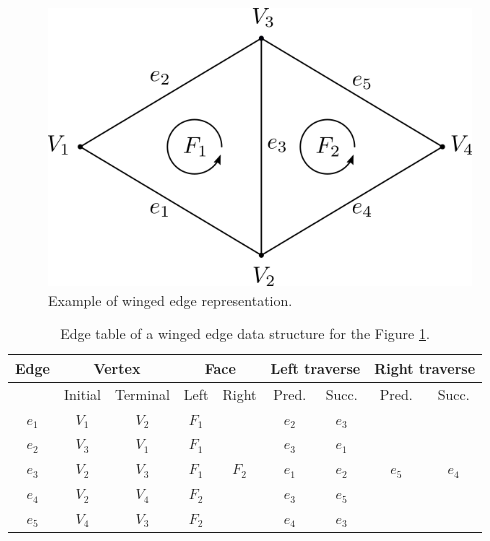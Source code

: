 \begin{figure}
    \centerline{\includegraphics[scale=0.5]{images/img30}}
    \caption[Example of winged edge representation]
    {Example of winged edge representation.}
    \label{img:30}
\end{figure}

\begin{table}[]\centering
    \begin{tabular}{|c|cc|cc|cc|cc|}
    \hline
    \hline
    Edge  & \multicolumn{2}{c|}{Vertex} & \multicolumn{2}{c|}{Face} & \multicolumn{2}{c|}{Left traverse} & \multicolumn{2}{c|}{Right traverse} \\ \hline
          & Initial      & Terminal     & Left        & Right       & Pred.            & Succ.           & Pred.            & Succ.            \\ \hline\hline
    $e_1$ & $V_1$        & $V_2$        & $F_1$       &             & $e_2$            & $e_3$           &                  &                  \\ \hline
    $e_2$ & $V_3$        & $V_1$        & $F_1$       &             & $e_3$            & $e_1$           &                  &                  \\ \hline
    $e_3$ & $V_2$        & $V_3$        & $F_1$       & $F_2$       & $e_1$            & $e_2$           & $e_5$            & $e_4$            \\ \hline
    $e_4$ & $V_2$        & $V_4$        & $F_2$       &             & $e_3$            & $e_5$           &                  &                  \\ \hline
    $e_5$ & $V_4$        & $V_3$        & $F_2$       &             & $e_4$            & $e_3$           &                  &                  \\ \hline\hline
    \end{tabular}
\caption{Edge table of a winged edge data structure for the Figure \ref{img:30}.}
\label{tab:2}
\end{table}

